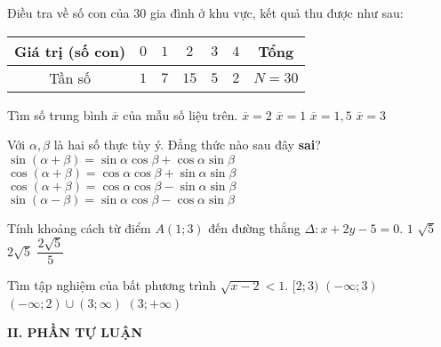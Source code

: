 \begin{ex}%
	Điều tra về số con của $30$ gia đình ở khu vực, kết quả thu được như sau:
	\begin{center}
	\begin{tabular}{|c|c|c|c|c|c|c|}
	\hline 
	Giá trị (số con) & $0$ &$1$ & $2$ &$3$ & $4$ & Tổng \\ 
	\hline 
	Tần số & $1$ & $7$ & $15$ & $5$ & $2$ & $N=30$ \\ 
	\hline 
	\end{tabular}
	\end{center}
	Tìm số trung bình $\overline{x}$ của mẫu số liệu trên.
	\choice
	{\True $\overline{x}=2$}
	{$\overline{x}=1$}
	{$\overline{x}=1{,}5$}
	{$\overline{x}=3$}
\end{ex} 
\begin{ex}%
	Với $\alpha, \beta$ là hai số thực tùy ý. Đẳng thức nào sau đây\textbf{ sai}?
	\choice
	{$\sin(\alpha+\beta)=\sin\alpha \cos\beta+\cos\alpha \sin\beta$}
	{\True $\cos(\alpha+\beta)=\cos\alpha \cos\beta+\sin\alpha \sin\beta$}
	{$\cos(\alpha+\beta)=\cos\alpha \cos\beta-\sin\alpha \sin\beta$}
	{$\sin(\alpha-\beta)=\sin\alpha \cos\beta-\cos\alpha \sin\beta$}
\end{ex} 
\begin{ex}%
	Tính khoảng cách từ điểm $A(1;3)$ đến đường thẳng $\Delta:x+2y-5=0$.
	\choice
	{$1$}
	{$\sqrt{5}$}
	{$2\sqrt{5}$}
	{\True $\dfrac{2\sqrt{5}}{5}$}
\end{ex} 
\begin{ex}%
	Tìm tập nghiệm của bất phương trình $\sqrt{x-2}<1$.
	\choice
	{\True $[2;3)$}
	{$(-\infty;3)$}
	{$(-\infty;2)\cup (3;\infty)$}
	{$(3;+\infty)$}
	\loigiai{
	$\sqrt{x-2}<1\Leftrightarrow \heva{&x-2<1\\&x-2\geq 0}\Leftrightarrow\heva{x<3\\x\geq 2}$. Vậy bất phương trình có tập nghiệm là $[2;3)$.
	}
\end{ex}
\noindent\textbf{II. PHẦN TỰ LUẬN}
